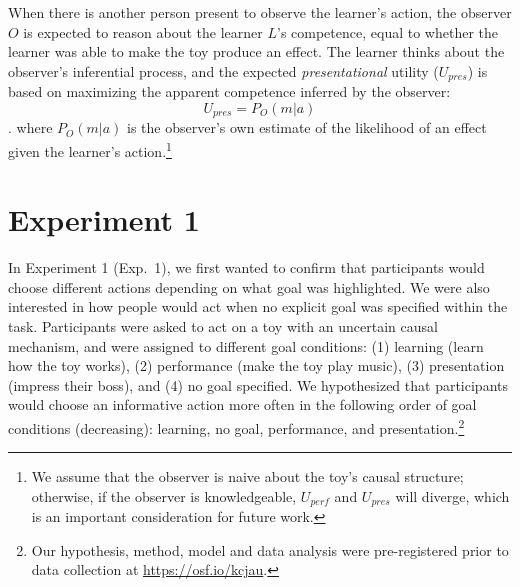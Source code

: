 \documentclass[10pt, letterpaper]{article}
\begin{document}
When there is another person present to observe the learner's action,
the observer \(O\) is expected to reason about the learner \(L\)'s
competence, equal to whether the learner was able to make the toy
produce an effect. The learner thinks about the observer's inferential
process, and the expected \emph{presentational} utility (\(U_{pres}\))
is based on maximizing the apparent competence inferred by the observer:
\[ U_{pres} = P_O(m | a)\]. \noindent
where \(P_O(m | a)\) is the observer's own estimate of the likelihood of
an effect given the learner's action.\footnote{We assume that the
  observer is naive about the toy's causal structure; otherwise, if the
  observer is knowledgeable, \(U_{perf}\) and \(U_{pres}\) will diverge,
  which is an important consideration for future work.}

\section{Experiment 1}\label{experiment-1}

In Experiment 1 (Exp.~1), we first wanted to confirm that participants
would choose different actions depending on what goal was highlighted.
We were also interested in how people would act when no explicit goal
was specified within the task. Participants were asked to act on a toy
with an uncertain causal mechanism, and were assigned to different goal
conditions: (1) learning (learn how the toy works), (2) performance
(make the toy play music), (3) presentation (impress their boss), and
(4) no goal specified. We hypothesized that participants would choose an
informative action more often in the following order of goal conditions
(decreasing): learning, no goal, performance, and
presentation.\footnote{Our hypothesis, method, model and data analysis were pre-registered prior to data collection at \url{https://osf.io/kcjau}.}
\end{document}
